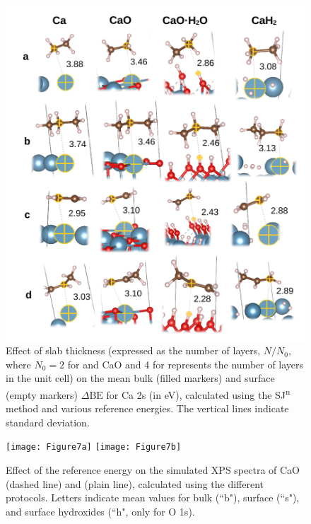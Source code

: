 \documentclass[journal=jpccck,manuscript=article]{achemso}
\def\dbe{\ensuremath{\Delta\text{BE}}}
\begin{document}
\begin{figure}[!h]
	\centering
	\includegraphics[width=.85\linewidth]{Figure6}
	\caption{Effect of slab thickness (expressed as the number of layers, $N/N_0$, where $N_0 = 2$ for  and CaO and 4 for  represents the number of layers in the unit cell)  on the mean bulk (filled markers) and surface (empty markers) \dbe{} for Ca 2s (in \si{\electronvolt}), calculated using the SJ\textsuperscript{n} method and various reference energies. The vertical lines indicate standard deviation.}
	\label{fig:slabsthicknessSJn}
\end{figure}


\begin{figure}[!h]
	\centering
	\texttt{[image: Figure7a]}
	\texttt{[image: Figure7b]}
	\caption{Effect of the reference energy on the simulated XPS spectra of CaO (dashed line)  and  (plain line), calculated using the different protocols. Letters indicate mean values for bulk (``b"), surface (``s"), and surface hydroxides (``h", only for   O 1s).}
	\label{fig:slabOH2}
\end{figure}
\end{document}

